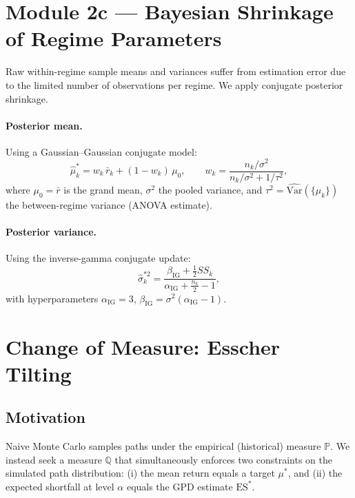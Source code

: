 \documentclass[12pt]{article}
\newcommand{\Q}{\mathbb{Q}}
\newcommand{\P}{\mathbb{P}}
\begin{document}
\section{Module 2c — Bayesian Shrinkage of Regime Parameters}

Raw within-regime sample means and variances suffer from estimation
error due to the limited number of observations per regime.  We
apply conjugate posterior shrinkage.

\paragraph{Posterior mean.}
Using a Gaussian--Gaussian conjugate model:
\begin{equation}
  \hat\mu_k^* = w_k\,\bar r_k + (1-w_k)\,\mu_0, \qquad
  w_k = \frac{n_k/\sigma^2}{n_k/\sigma^2 + 1/\tau^2},
\end{equation}
where $\mu_0 = \bar r$ is the grand mean, $\sigma^2$ the pooled
variance, and $\tau^2 = \widehat{\mathrm{Var}}(\{\mu_k\})$ the
between-regime variance (ANOVA estimate).

\paragraph{Posterior variance.}
Using the inverse-gamma conjugate update:
\begin{equation}
  \hat\sigma_k^{*2} = \frac{\beta_{\text{IG}} + \frac{1}{2}SS_k}
    {\alpha_{\text{IG}} + \frac{n_k}{2} - 1},
\end{equation}
with hyperparameters $\alpha_{\text{IG}} = 3$, $\beta_{\text{IG}} = \sigma^2(\alpha_{\text{IG}}-1)$.

\section{Change of Measure: Esscher Tilting}

\subsection{Motivation}

Naive Monte Carlo samples paths under the empirical (historical)
measure $\P$.  We instead seek a measure $\Q$ that simultaneously
enforces two constraints on the simulated path distribution:
(i) the mean return equals a target $\mu^*$, and (ii) the expected
shortfall at level $\alpha$ equals the GPD estimate $\text{ES}^*$.
\end{document}
